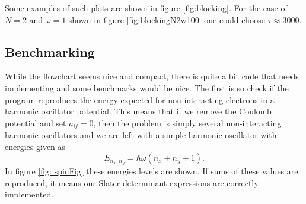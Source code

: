 \documentclass[english, a4paper]{article}
\newcommand\lr[1]{\left(#1\right)}
\begin{document}
	Some examples of such plots are shown in figure \ref{fig:blocking}. For the case of $N=2$ and $\omega=1$ shown in figure \ref{fig:blockingN2w100} one could choose $\tau \approx 3000$.
	\subsection{Benchmarking}
	While the flowchart seems nice and compact, there is quite a bit code that needs implementing and some benchmarks would be nice. The first is so check if the program reproduces the energy expected for non-interacting electrons in a harmonic oscillator potential. This means that if we remove the Coulomb potential and set $a_{ij} = 0$, then the problem is simply several non-interacting harmonic oscillators and we are left with a simple harmonic oscillator with energies given as
	\begin{equation}
	E_{n_x,n_y} = \hbar\omega\lr{n_x + n_y +1}.
	\end{equation}
	In figure \ref{fig: spinFig} these energies levels are shown. If sums of these values are reproduced, it means our Slater determinant expressions are correctly implemented.
		
\end{document}
